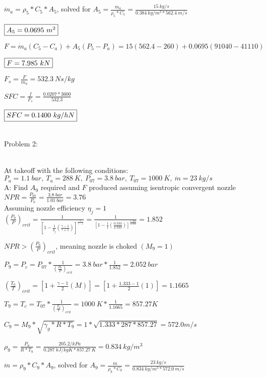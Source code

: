 \documentclass{article}
\begin{document}
$\dot{m}_a=\rho_5*C_5*A_5$, solved for $A_5=\frac{\dot{m}_a}{\rho_5*C_5}=\frac{15\ kg/s}{0.384\ kg/m^3*562.4\ m/s}$

$\fbox{$A_5=0.0695\ m^2$}$

$F=\dot{m}_a(C_5-C_a)+A_5(P_5-P_a)=15(562.4-260)+0.0695(91040-41110)$

$\fbox{$F=7.985\ kN$}$

$F_s=\frac{F}{\dot{m}_a}=532.3\ Ns/kg$

$SFC=\frac{f}{F_s}=\frac{0.0207*3600}{532.3}$

$\fbox{$SFC=0.1400\ kg/hN$}$
\\
\\

\begin{LARGE}
	Problem 2:
\end{LARGE}
\\

At takeoff with the following conditions:
\\

$P_a=1.1\ bar,\ T_a=288\ K,\ P_{07}=3.8\ bar,\ T_{07}=1000\ K,\ \dot{m}=23\ kg/s$
\\

A: Find $A_9$ required and $F$ produced assuming isentropic convergent nozzle
\\

$NPR=\frac{P_{07}}{P_a}=\frac{3.8\ bar}{1.01\ bar}=3.76$
\\

Assuming nozzle efficiency $\eta_j=1$
\\

$(\frac{P_0}{P})_{crit}=\frac{1}{[1-\frac{1}{\eta_j}(\frac{\gamma-1}{\gamma+1})]^{\frac{\gamma}{\gamma-1}}}
=\frac{1}{[1-\frac{1}{1}(\frac{0.333}{2.333})]^{\frac{1.333}{0.333}}}=1.852$

$NPR>(\frac{P_0}{P})_{crit}$, meaning nozzle is choked $(M_9=1)$

$P_9=P_c=P_{07}*\frac{1}{(\frac{P_0}{P})_{crit}}=3.8\ bar*\frac{1}{1.852}=2.052\ bar$

$(\frac{T_0}{T})_{crit}=[1+\frac{\gamma-1}{2}(M)]=[1+\frac{1.333-1}{2}(1)]=1.1665$

$T_9=T_c=T_{07}*\frac{1}{(\frac{T_0}{T})_{crit}}=1000\ K*\frac{1}{1.1665}=857.27K$

$C_9=M_9*\sqrt{\gamma_g*R*T_9}=1*\sqrt{1.333*287*857.27}=572.0 m/s$

$\rho_9=\frac{P_9}{R*T_9}=\frac{205.2/ kPa}{0.287\ kJ/kgK*857.27\ K}=0.834\ kg/m^3$

$\dot{m}=\rho_9*C_9*A_9$, solved for $A_9=\frac{\dot{m}}{\rho_9*C_9}=\frac{23\ kg/s}{0.834\ kg/m^3*572.0\ m/s}$
\end{document}
